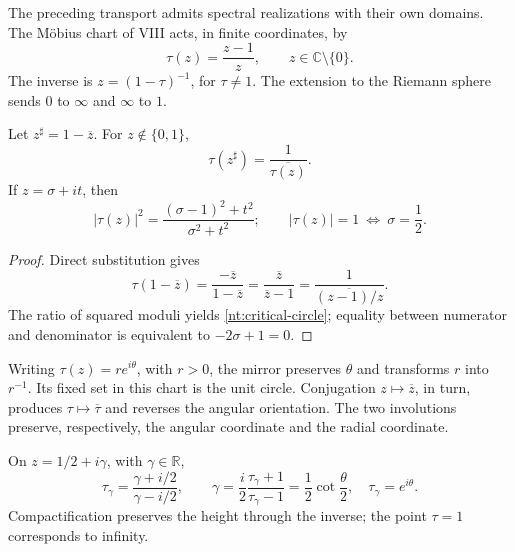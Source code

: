 The preceding transport admits spectral realizations
with their own domains. The M\"obius chart of VIII acts,
in finite coordinates, by
\begin{equation}
 \tau(z)=\frac{z-1}{z},
 \qquad z\in\mathbb C\setminus\{0\}.
 \label{nt:mobius}
\end{equation}
The inverse is \(z=(1-\tau)^{-1}\), for \(\tau\ne1\).
The extension to the Riemann sphere sends \(0\) to
\(\infty\) and \(\infty\) to \(1\).

\begin{proposition}
Let \(z^\sharp=1-\overline z\). For
\(z\notin\{0,1\}\),
\begin{equation}
 \tau(z^\sharp)=\frac1{\overline{\tau(z)}}.
 \label{nt:mirror}
\end{equation}
If \(z=\sigma+it\), then
\begin{equation}
 |\tau(z)|^2
 =\frac{(\sigma-1)^2+t^2}{\sigma^2+t^2};
 \qquad
 |\tau(z)|=1\ \Longleftrightarrow\ \sigma=\frac12.
 \label{nt:critical-circle}
\end{equation}
\end{proposition}

\begin{proof}
Direct substitution gives
\[
 \tau(1-\overline z)
 =\frac{-\overline z}{1-\overline z}
 =\frac{\overline z}{\overline z-1}
 =\frac1{\overline{(z-1)/z}}.
\]
The ratio of squared moduli yields
\eqref{nt:critical-circle}; equality between numerator and
denominator is equivalent to \(-2\sigma+1=0\).
\end{proof}

Writing \(\tau(z)=r e^{i\theta}\), with \(r>0\), the
mirror preserves \(\theta\) and transforms \(r\) into \(r^{-1}\).
Its fixed set in this chart is the unit circle.
Conjugation \(z\mapsto\overline z\), in turn,
produces \(\tau\mapsto\overline\tau\) and reverses the angular
orientation. The two involutions preserve, respectively,
the angular coordinate and the radial coordinate.

On \(z=1/2+i\gamma\), with \(\gamma\in\mathbb R\),
\begin{equation}
 \tau_\gamma=\frac{\gamma+i/2}{\gamma-i/2},
 \qquad
 \gamma=\frac{i}{2}\frac{\tau_\gamma+1}{\tau_\gamma-1}
       =\frac12\cot\frac{\theta}{2},
 \quad \tau_\gamma=e^{i\theta}.
 \label{nt:spectral-phase}
\end{equation}
Compactification preserves the height through the inverse;
the point \(\tau=1\) corresponds to infinity.


